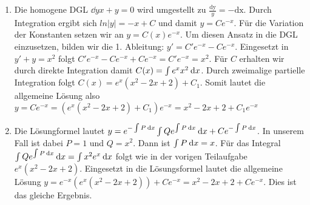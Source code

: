 \item

\begin{enumerate}
	\item Die homogene DGL $\dd{y}{x} + y = 0$ wird umgestellt zu $\frac{\text{dy}}{y} = -\text{dx}$. Durch Integration ergibt sich $ln|y| = -x + C$ und damit $y = C e^{-x}$. Für die Variation der Konstanten setzen wir an $y = C(x) e^{-x}$. Um diesen Ansatz in die DGL einzusetzen, bilden wir die 1. Ableitung: $y' = C' e^{-x} - C e^{-x}$. Eingesetzt in $y'+y=x^2$ folgt $C'e^{-x}-Ce^{-x}+Ce^{-x}=C'e^{-x}=x^2$. Für $C$ erhalten wir durch direkte Integration damit $C(x) = \int e^{x}x^2 \:\mathrm{d}{x}$. Durch zweimalige partielle Integration folgt $C(x) = e^x (x^2-2x+2) + C_1$. Somit lautet die allgemeine Lösung also $y = C e^{-x} = (e^x (x^2-2x+2) + C_1) e^{-x} = x^2-2x+2 + C_1 e^{-x}$
	\item Die Lösungformel lautet $y =  e^{-\int P \:\mathrm{d}{x}} \int Q e^{\int P \:\mathrm{d}{x}} \:\mathrm{d}{x}   + C e^{-\int P \:\mathrm{d}{x}}$. In unserem Fall ist dabei $P=1$ und $Q=x^2$. Dann ist $\int P \:\mathrm{d}{x} = x$. Für das Integral $\int Q e^{\int P \:\mathrm{d}{x}} \:\mathrm{d}{x} = \int x^2 e^{x} \:\mathrm{d}{x}$ folgt wie in der vorigen Teilaufgabe $e^x (x^2-2x+2)$. Eingesetzt in die Lösungsformel lautet die allgemeine Lösung $y = e^{-x} (e^x (x^2-2x+2)) + C e^{-x} = x^2-2x+2 + C e^{-x}$. Dies ist das gleiche Ergebnis.
\end{enumerate}